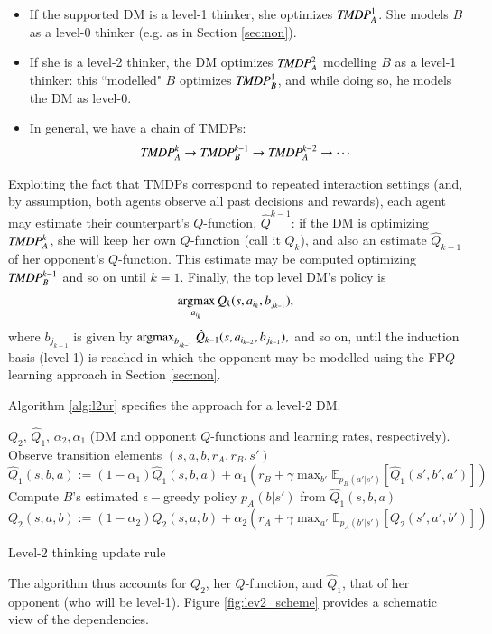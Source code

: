 \begin{itemize}
\item If the supported DM is a level-1 thinker, she optimizes  $ \emph{TMDP}_{A}^1 $. She models $B$ as a level-0 thinker
(e.g. as in Section \ref{sec:non}).
\item If she is a level-2 thinker, the DM optimizes 
$ \emph{TMDP}_{A}^2 $ modelling $B$ as a level-1 thinker:
this ``modelled" $B$ optimizes $ \emph{TMDP}_{B}^1 $, and while doing so,
he models the DM as level-0.%
\item In general, we have a chain of TMDPs:
$$ \emph{TMDP}_{A}^k \rightarrow \emph{TMDP}_{B}^{k-1}
\rightarrow \emph{TMDP}_{A}^{k-2}  \rightarrow \cdots $$
\end{itemize}
Exploiting the fact that TMDPs correspond to repeated interaction settings
(and, by assumption, both agents observe all past
decisions and rewards), each agent may  estimate their
counterpart's $Q$-function, $\hat{Q}^{k-1}$: 
if the DM is optimizing $\emph{TMDP}_A^k$, she will keep her own 
$Q$-function (call it $Q_k$), and also an estimate
$\hat{Q}_{k-1}$ of her opponent's $Q$-function. This estimate may be
computed optimizing $\emph{TMDP}_B^{k-1}$ and so on until $k=1$.
Finally, the top level DM's policy is 
\[
\operatorname*{argmax}_{a_{i_k}} Q_k(s, a_{i_k}, b_{j_{k-1}}),
\]
where $b_{j_{k-1}}$ is given by 
$
\operatorname*{argmax}_{b_{j_{k-1}}} \hat{Q}_{k-1}(s, a_{i_{k-2}}, b_{j_{k-1}}),
$ and so on, until the induction basis (level-1) is reached 
in which the opponent may be modelled using the FP$Q$-learning approach 
in Section \ref{sec:non}.

Algorithm \ref{alg:l2ur} specifies the approach 
for a level-2 DM. 

\begin{algorithm*}[!ht]
\begin{algorithmic}
\Require $Q_2$, $\hat{Q}_1$, $\alpha_2, \alpha_1$ (DM and opponent $Q$-functions
and learning rates, respectively).
\State Observe  transition elements $(s, a, b, r_A, r_B, s')$ 
\State $\hat{Q}_1(s,b,a) := (1 - \alpha_1)\hat{Q}_1(s,b,a)  + \alpha_1 (r_B + \gamma \max_{b'} \mathbb{E}_{p_B(a'|s')} \left[ \hat{Q}_1(s',b', a') \right] )$ 
\State Compute $B$'s estimated $\epsilon-$greedy policy $p_A(b|s')$ from $\hat{Q}_1(s,b,a)$
\State $Q_2(s,a,b) := (1 - \alpha_2)Q_2(s,a,b) + \alpha_2 (r_A + \gamma \max_{a'} \mathbb{E}_{p_A(b'|s')} \left[ Q_2(s',a',b') \right]) $ 
\end{algorithmic}
\caption{Level-2 thinking update rule}
\label{alg:l2ur}
\end{algorithm*}
\noindent 
The algorithm thus accounts for $Q_2$,  her $Q$-function,  and $\hat{Q}_1$,
that of her
opponent (who will be level-1). Figure
\ref{fig:lev2_scheme} provides a schematic view of the dependencies.

